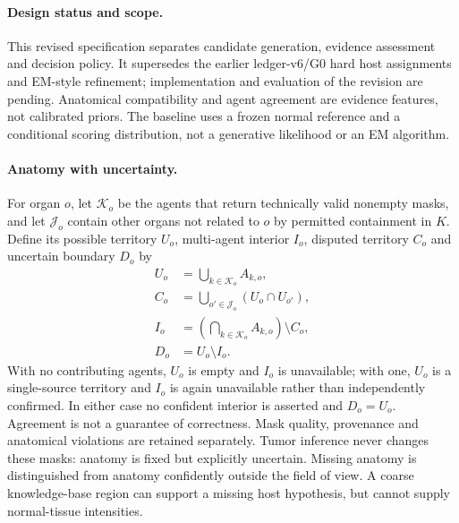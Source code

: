 \documentclass[fleqn,10pt]{olplainarticle}
\begin{document}
\paragraph{Design status and scope.}
This revised specification separates candidate generation, evidence assessment and decision policy. It supersedes the
earlier ledger-v6/G0 hard host assignments and EM-style refinement; implementation and evaluation of the revision are
pending. Anatomical compatibility and agent agreement are evidence features, not calibrated priors. The baseline uses a
frozen normal reference and a conditional scoring distribution, not a generative likelihood or an EM algorithm.

\paragraph{Anatomy with uncertainty.}
For organ $o$, let $\mathcal{K}_o$ be the agents that return technically valid nonempty masks, and let $\mathcal{J}_o$
contain other organs not related to $o$ by permitted containment in $K$. Define its possible territory
$U_o$, multi-agent interior $I_o$, disputed territory $C_o$ and uncertain boundary $D_o$ by
\begin{equation}
\label{eq:organ_reference}
\begin{aligned}
U_o&=\bigcup_{k\in\mathcal{K}_o}A_{k,o},\\
C_o&=\bigcup_{o'\in\mathcal{J}_o}(U_o\cap U_{o'}),\\
I_o&=\left(\bigcap_{k\in\mathcal{K}_o}A_{k,o}\right)\setminus C_o,\\
D_o&=U_o\setminus I_o .
\end{aligned}
\end{equation}
With no contributing agents, $U_o$ is empty and $I_o$ is unavailable; with one, $U_o$ is a single-source territory and
$I_o$ is again unavailable rather than independently confirmed. In either case no confident interior is asserted and
$D_o=U_o$. Agreement is not a guarantee of correctness. Mask quality, provenance and anatomical violations
are retained separately. Tumor inference never changes these masks: anatomy is fixed but explicitly uncertain. Missing
anatomy is distinguished from anatomy confidently outside the field of view. A coarse knowledge-base region can support
a missing host hypothesis, but cannot supply normal-tissue intensities.
\end{document}

